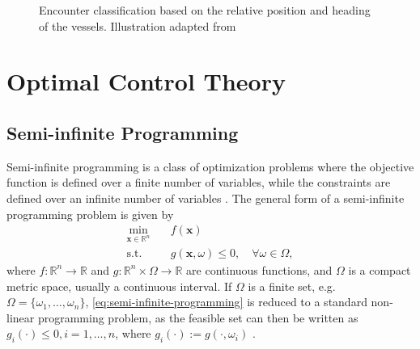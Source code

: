 \begin{figure}
    \centering
    
    \caption{Encounter classification based on the relative position and heading of the vessels. Illustration adapted from \cite{Thyri2022-Confined-Waters}}
    \label{fig:encounter-classification}
\end{figure}


\section{Optimal Control Theory}
\subsection{Semi-infinite Programming}\label{sec:semi-infinite-programming}

Semi-infinite programming is a class of optimization problems where the objective function is defined over a finite number of variables, while the constraints are defined over an infinite number of variables \citep{Bonnans2013-gt}. The general form of a semi-infinite programming problem is given by
\begin{equation}\label{eq:semi-infinite-programming}
    \begin{aligned}
        \min_{\mathbf x \in \mathbb R^n} \quad & f(\mathbf x) \\
        \text{s.t.} \quad & g(\mathbf x, \omega) \leq 0, \quad \forall \omega \in \Omega,
    \end{aligned}
\end{equation}
where $f : \mathbb R^n \to \mathbb R$ and $g : \mathbb R^n \times \Omega \to \mathbb R$ are continuous functions, and $\Omega$ is a compact metric space, usually a continuous interval. If $\Omega$ is a finite set, e.g. $\Omega = \{\omega_1,\ldots,\omega_n\}$, \cref{eq:semi-infinite-programming} is reduced to a standard non-linear programming problem, as the feasible set can then be written as $g_i(\cdot) \leq 0, i = 1,\ldots,n$, where $g_i(\cdot) := g(\cdot, \omega_i)$ \citep{Bonnans2013-gt}.

